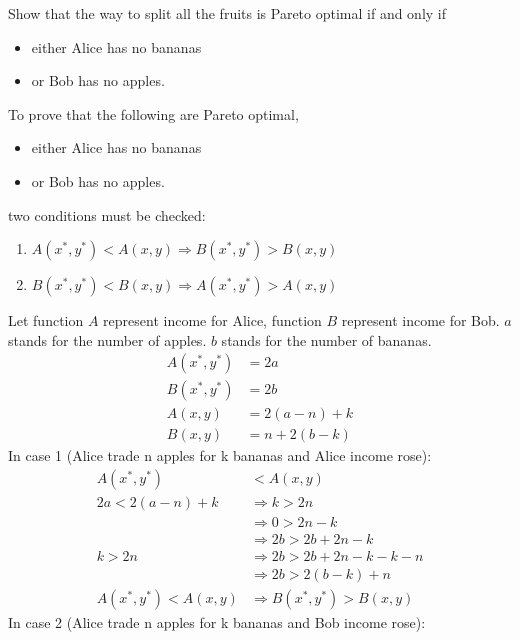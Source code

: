 \documentclass[addpoints,answers]{exam}
\begin{document}
\begin{questions}
            Show that the way to split all the fruits is Pareto optimal if and only if
            \begin{itemize}
                \item either Alice has no bananas
                \item or Bob has no apples.
            \end{itemize}
            \begin{solutionorbox}[\stretch{1}]
							To prove that the following are Pareto optimal,
            \begin{itemize}
                \item either Alice has no bananas
                \item or Bob has no apples.
            \end{itemize}
						two conditions must be checked: 
						\begin{enumerate}
							\item $A(x^*, y^*) < A(x,y) \Rightarrow B(x^*, y^*) > B(x,y)$
							\item $B(x^*, y^*) < B(x,y) \Rightarrow A(x^*, y^*) > A(x,y)$
						\end{enumerate}
						Let function $A$ represent income for Alice, function $B$ represent
						income for Bob. $a$ stands for the number of apples. $b$ stands for
						the number of bananas.
						\begin{align*}
							A(x^*, y^*) &= 2a\\
							B(x^*, y^*) &= 2b\\
							A(x, y) &= 2(a-n) + k\\
							B(x, y) &= n + 2(b-k)
						\end{align*}
						In case 1 (Alice trade n apples for k bananas and Alice income rose):
						\begin{align*}
							A(x^*, y^*) &< A(x, y)\\
							2a < 2(a-n) + k &\Rightarrow k>2n\\
															&\Rightarrow 0 > 2n -k\\
															&\Rightarrow 2b > 2b + 2n -k\\
												 k>2n	&\Rightarrow 2b > 2b + 2n -k -k - n\\
														  &\Rightarrow 2b > 2(b-k) + n\\
							A(x^*, y^*) < A(x, y)&\Rightarrow B(x^*, y^*) > B(x,y)
						\end{align*}
						In case 2 (Alice trade n apples for k bananas and Bob income rose):
						\begin{align*}

\end{align*}
\end{solutionorbox}
\end{questions}
\end{document}

